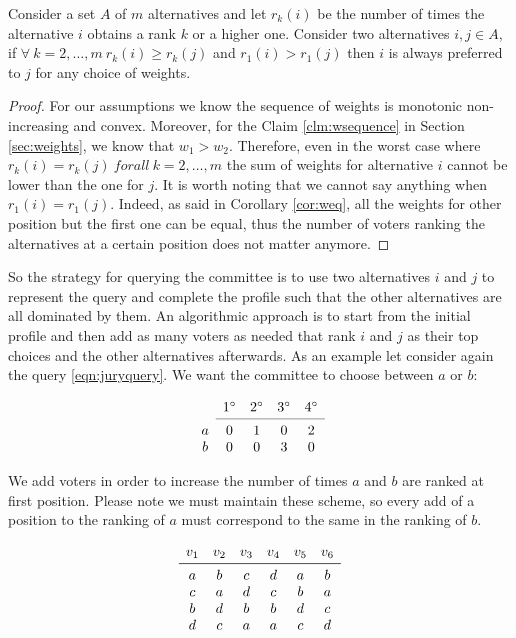 \begin{claim}
	Consider a set $A$ of $m$ alternatives and let $r_k(i)$ be the number of times the alternative $i$ obtains a rank $k$ or a higher one. Consider two alternatives $ i,j \in A$, if $\forall \ k=2, \dots,m \ r_k(i)\geq r_k(j)$ and $r_1(i) > r_1(j)$ then $i$ is always preferred to $j$ for any choice of weights.
\end{claim}

\begin{proof}
	For our assumptions we know the sequence of weights is monotonic non-increasing and convex. Moreover, for the Claim \ref{clm:wsequence} in Section \ref{sec:weights}, we know that $w_1 > w_2$. Therefore, even in the worst case where $r_k(i) = r_k(j) \ forall \ k=2, \dots,m$ the sum of weights for alternative $i$ cannot be lower than the one for $j$. It is worth noting that we cannot say anything when $r_1(i) = r_1(j)$. Indeed, as said in Corollary \ref{cor:weq}, all the weights for other position but the first one can be equal, thus the number of voters ranking the alternatives at a certain position does not matter anymore.	
\end{proof}

So the strategy for querying the committee is to use two alternatives $i$ and $j$ to represent the query and complete the profile such that the other alternatives are all dominated by them. An algorithmic approach is to start from the initial profile and then add as many voters as needed that rank $i$ and $j$ as their top choices and the other alternatives afterwards. As an example let consider again the query \ref*{eqn:juryquery}. We want the committee to choose between $a$ or $b$:

\[
\begin{array}{ccccc}
& 1^\circ
& 2^\circ
& 3^\circ
& 4^\circ \\
\cmidrule{2-5}
a 
& 0
& 1
& 0
& 2 \\
b
& 0
& 0
& 3
& 0 \\
\end{array}
\]

We add voters in order to increase the number of times $a$ and $b$ are ranked at first position. Please note we must maintain these scheme, so every add of a position to the ranking of $a$ must correspond to the same in the ranking of $b$.

\[
\begin{array}{cccccc}
v_1
& v_2
& v_3 
& v_4
& v_5
& v_6 \\
\midrule 
a
& b
& c 
& d
& a
& b \\
c
& a
& d
& c
& b
& a \\
b
& d
& b
& b
& d
& c \\
d
& c
& a
& a
& c
& d \\
\end{array}
\]

